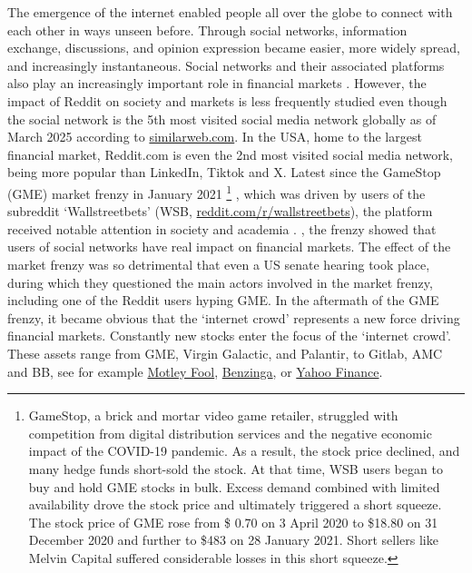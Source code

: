 
The emergence of the internet enabled people all over the globe to connect with each other in ways unseen before. Through social networks, information exchange, discussions, and opinion expression became easier, more widely spread, and increasingly instantaneous. Social networks and their associated platforms also play an increasingly important role in financial markets \citep{Deng2024, Gopal2024,Bartov2023,Peng2024,Gu2020}. 
However, the impact of Reddit on society and markets is less frequently studied even though the social network is the 5th most visited social media network globally as of March 2025 according to \href{https://www.similarweb.com/}{similarweb.com}. In the USA, home to the largest financial market, Reddit.com is even the 2nd most visited social media network, being more popular than LinkedIn, Tiktok and X. 
Latest since the GameStop (GME) market frenzy in January 2021 \footnote{GameStop, a brick and mortar video game retailer, struggled with competition from digital distribution services and the negative economic impact of the COVID-19 pandemic. As a result, the stock price declined, and many hedge funds short-sold the stock. At that time, WSB users began to buy and hold GME stocks in bulk. Excess demand combined with limited availability drove the stock price and ultimately triggered a short squeeze. The stock price of GME rose from \$ 0.70 on 3 April 2020 to \$18.80 on 31 December 2020 and further to \$483 on 28 January 2021. Short sellers like Melvin Capital suffered considerable losses in this short squeeze.} , which was driven by users of the subreddit `Wallstreetbets' (WSB, \hyperlink{https://www.reddit.com/r/wallstreetbets/}{reddit.com/r/wallstreetbets}), the platform received notable attention in society and academia \citep{Pedersen2022,Klein2022,Umar2021,molders2025understanding}. , the frenzy showed that users of social networks have real impact on financial markets. The effect of the market frenzy was so detrimental that even a US senate hearing took place, during which they questioned the main actors involved in the market frenzy, including one of the Reddit users hyping GME. In the aftermath of the GME frenzy, it became obvious that the `internet crowd' represents a new force driving financial markets. Constantly new stocks enter the focus of the `internet crowd'. These assets range from GME, Virgin Galactic, and Palantir, to Gitlab, AMC and BB, see for example \hyperlink{https://www.fool.com/investing/stock-market/types-of-stocks/meme-stocks/}{Motley Fool}, \hyperlink{https://www.benzinga.com/money/best-meme-stocks}{Benzinga}, or \hyperlink{https://finance.yahoo.com/news/12-best-meme-stocks-buy-191420607.html}{Yahoo Finance}. 

